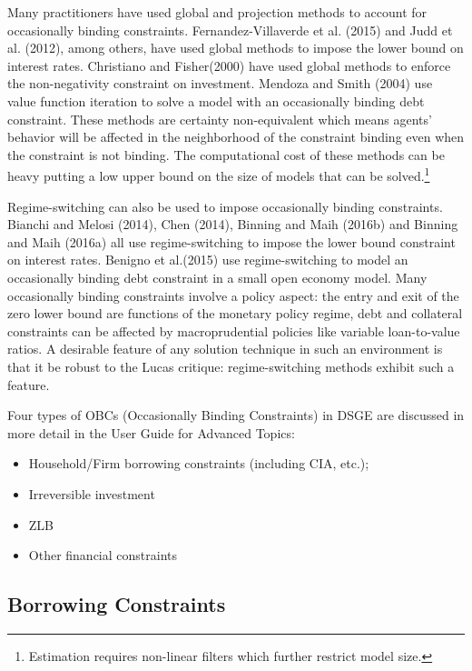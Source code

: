 \documentclass[10pt,math=newtx,citestyle=gb7714-2015,bibstyle=gb7714-2015]{elegantbook}
\begin{document}
Many practitioners have used global and projection methods to account for occasionally binding constraints. Fernandez-Villaverde et al. (2015) and Judd et al. (2012), among others, have used global methods to impose the lower bound on interest rates. Christiano and Fisher(2000) have used global methods to enforce the non-negativity constraint on investment. Mendoza and Smith (2004) use value function iteration to solve a model with an occasionally binding debt constraint. These methods are certainty non-equivalent which means agents' behavior will be affected in the neighborhood of the constraint binding even when the constraint is not binding. The computational cost of these methods can be heavy putting a low upper bound on the size of models that can be solved.\footnote{Estimation requires non-linear filters which further restrict model size.}

Regime-switching can also be used to impose occasionally binding constraints. Bianchi and Melosi (2014), Chen (2014), Binning and Maih (2016b) and Binning and Maih (2016a) all use regime-switching to impose the lower bound constraint on interest rates. Benigno et al.(2015) use regime-switching to model an occasionally binding debt constraint in a small open economy model. Many occasionally binding constraints involve a policy aspect: the entry and exit of the zero lower bound are functions of the monetary policy regime, debt and collateral constraints can be affected by macroprudential policies like variable loan-to-value ratios. A desirable feature of any solution technique in such an environment is that it be robust to the Lucas critique: regime-switching methods exhibit such a feature.

Four types of OBCs (Occasionally Binding Constraints) in DSGE are discussed in more detail in the User Guide for Advanced Topics:

\begin{itemize}
	\item Household/Firm borrowing constraints (including CIA, etc.);
	
	\item Irreversible investment
	
	\item ZLB
	
	\item Other financial constraints
\end{itemize}

\subsection{Borrowing Constraints}
\end{document}
